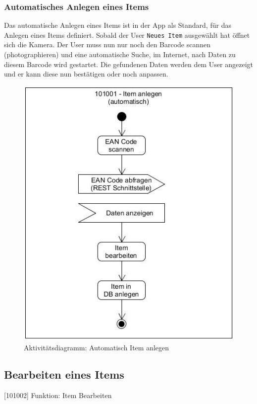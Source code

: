 \subsubsection{Automatisches Anlegen eines Items}

Das automatische Anlegen eines Items ist in der App als Standard, für das Anlegen eines Items definiert. Sobald der User {\color{IndianRed}\texttt{Neues Item}} ausgewählt hat öffnet sich die Kamera. Der User muss nun nur noch den Barcode scannen (photographieren) und eine automatische Suche, im Internet, nach Daten zu diesem Barcode wird gestartet. Die gefundenen Daten werden dem User angezeigt und er kann diese nun bestätigen oder noch anpassen.

\begin{figure}[htbp]
	\centering
	\includegraphics[scale=0.6]{pic/101001a}
	\caption{Aktivitätsdiagramm: Automatisch Item anlegen}
\end{figure}

\subsection{Bearbeiten eines Items}

[101002] Funktion: Item Bearbeiten\\

